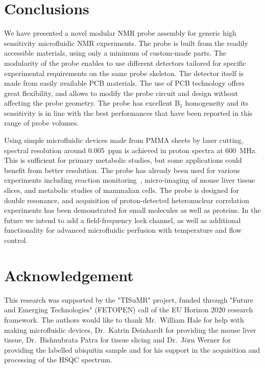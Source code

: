 \documentclass[preprint,5p]{elsarticle}
\begin{document}
\section{Conclusions}
We have presented a novel modular NMR probe assembly for generic high
sensitivity microfluidic NMR experiments.
The probe is built from the readily accessible materials, using only a minimum
of custom-made parts.
The modularity of the probe enables to use different detectors
tailored for specific experimental requirements on the same probe skeleton.
The detector itself is made from easily available PCB materials.
The use of PCB technology offers great flexibility, and allows to modify the
probe circuit and design without affecting the probe geometry.
The probe has excellent B$_1$ homogeneity and its sensitivity is in line with
the best performances that have been reported in this range of probe volumes.

Using simple microfluidic devices made from PMMA sheets by laser cutting,
spectral resolution around 0.005~ppm is achieved in proton spectra at
600~MHz. This is sufficient for primary metabolic studies, but some
applications could benefit from better resolution. The probe has already been
used for various  experiments including reaction monitoring~\cite{Fang-2018},
micro-imaging of mouse liver tissue slices, and metabolic studies of
mammalian cells. The probe is designed for double resonance, and
acquisition of proton-detected heteronuclear correlation experiments
has been demonstrated for small molecules as well as proteins.
In the future we intend to add a field-frequency lock channel,
as well as additional functionality for advanced microfluidic perfusion with temperature and flow control.
\section{Acknowledgement}
This research was supported by the "TISuMR" project,
funded through "Future and Emerging Technologies" (FETOPEN)
call of the EU Horizon 2020 research framework. The authors would like to
thank Mr.~William Hale for help with
making microfluidic devices, Dr.~Katrin Deinhardt for providing
the mouse liver tissue, Dr.~Bishnubrata Patra for tissue slicing and Dr.~J\"{o}rn Werner for providing the
labelled ubiquitin sample and for his support in the acquisition
and processing of the HSQC spectrum.
\clearpage


\end{document}
